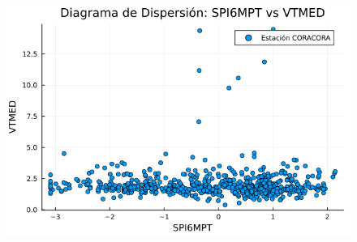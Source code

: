 \begin{figure}[htbp]
\begin{minipage}{0.32\textwidth}
    \includegraphics[width=\linewidth]{Capitulos/Scaterplot/CORACORA_SPI6MPT_vs_VTMED.png}
\end{minipage}

\vspace{0.5cm}  %


\end{figure}
